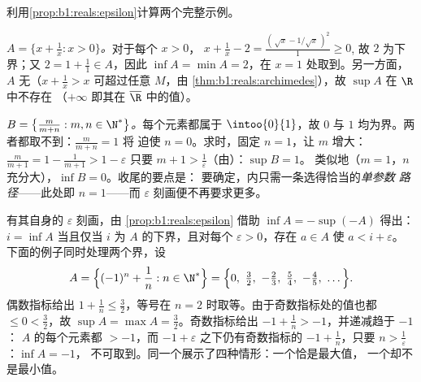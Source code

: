 \begin{example}[实际计算上确界]\label{ex:b1:reals:supcompute}
利用\cref{prop:b1:reals:epsilon}计算两个完整示例。

\emph{ $A = \{x + \frac1x : x > 0\}$。}对于每个 $x > 0$，
$x + \frac1x - 2 = \frac{(\,\sqrt x - 1/\sqrt x\,)^2}{1} \geq 0$,
故 $2$ 为下界；又 $2 = 1 + \frac11 \in A$，因此
$\inf A = \min A = 2$，在 $x = 1$ 处取到。另一方面，$A$
无（$x + \frac1x > x$ 可超过任意 $M$，由
\cref{thm:b1:reals:archimedes}），故 $\sup A$ 在 $\R$ 中不存在
（$+\infty$ 即其在 $\overline\R$ 中的值）。

\emph{ $B = \bigl\{\frac{m}{m + n} : m, n \in
\N^*\bigr\}$。}每个元素都属于 $\intoo{0}{1}$，故 $0$ 与
$1$ 均为界。两者都取不到：$\frac{m}{m+n} = 1$ 将
迫使 $n = 0$。求时，固定 $n = 1$，让 $m$ 增大：
$\frac{m}{m+1} = 1 - \frac{1}{m+1} > 1 - \varepsilon$ 只要
$m + 1 > \frac1\varepsilon$（由）：$\sup B = 1$。
类似地（$m = 1$，$n$ 充分大），$\inf B = 0$。收尾的要点是：
要确定，内只需一条选得恰当的\emph{单参数
路径}——此处即 $n = 1$——而
$\varepsilon$ 刻画便不再要求更多。
\end{example}

\begin{example}[下确界的对偶]\label{ex:b1:reals:infmirror}
有其自身的 $\varepsilon$ 刻画，由
\cref{prop:b1:reals:epsilon} 借助 $\inf A = -\sup(-A)$ 得出：
$i = \inf A$ 当且仅当 $i$ 为 $A$ 的下界，且对每个
$\varepsilon > 0$，存在 $a \in A$ 使 $a < i + \varepsilon$。
下面的例子同时处理两个界，设
\[
A = \Bigl\{(-1)^n + \frac1n : n \in \N^*\Bigr\}
= \Bigl\{0,\ \tfrac32,\ -\tfrac23,\ \tfrac54,\ -\tfrac45,\
\dots\Bigr\} .
\]
偶数指标给出 $1 + \frac1n \leq \frac32$，等号在
$n = 2$ 时取等。由于奇数指标处的值也都 $\leq 0 <
\frac32$，故 $\sup A = \max A = \frac32$。奇数指标给出
$-1 + \frac1n > -1$，并递减趋于 $-1$：
$A$ 的每个元素都 $> -1$，而 $-1 + \varepsilon$ 之下仍有奇数指标的 $-1 +
\frac1n$，只要 $n > \frac1\varepsilon$：$\inf A = -1$，
不可取到。同一个展示了四种情形：一个恰是最大值，
一个\omterm{def:b1:reals:bounds}{下确界}却不是最小值。
\end{example}

